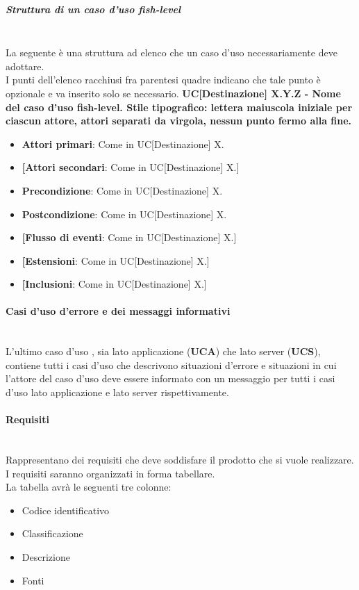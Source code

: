 \subparagraph*{Struttura di un caso d'uso fish-level}\mbox{}\\
La seguente è una struttura ad elenco che un caso d'uso  necessariamente deve adottare.\\
I punti dell'elenco racchiusi fra parentesi quadre indicano che tale punto è opzionale e va inserito solo se necessario.
\textbf{UC[Destinazione] X.Y.Z - Nome del caso d'uso fish-level. Stile tipografico: lettera maiuscola iniziale per ciascun attore, attori separati da virgola, nessun punto fermo alla fine.}%
\begin{itemize}
	\item \textbf{Attori primari}: Come in UC[Destinazione] X.
	\item \textbf{[Attori secondari}: Come in UC[Destinazione] X.]
	\item \textbf{Precondizione}: Come in UC[Destinazione] X.
	\item \textbf{Postcondizione}: Come in UC[Destinazione] X.
	\item \textbf{[Flusso di eventi}: Come in UC[Destinazione] X.]
	\item \textbf{[Estensioni}: Come in UC[Destinazione] X.]
	\item \textbf{[Inclusioni}: Come in UC[Destinazione] X.]
\end{itemize}

\paragraph{Casi d'uso d'errore e dei messaggi informativi}\mbox{}\\
L'ultimo caso d'uso , sia lato applicazione (\textbf{UCA}) che lato server (\textbf{UCS}), contiene tutti i casi d'uso che descrivono situazioni d'errore e situazioni in cui l'attore del caso d'uso deve essere informato con un messaggio per tutti i casi d'uso lato applicazione e lato server rispettivamente.\\
\paragraph{Requisiti}\mbox{}\\
Rappresentano dei requisiti che deve soddisfare il prodotto che si vuole realizzare.\\
I requisiti saranno organizzati in forma tabellare.\\
La tabella avrà le seguenti tre colonne:
\begin{itemize}
	\item Codice identificativo
	\item Classificazione
	\item Descrizione
	\item Fonti
\end{itemize}
